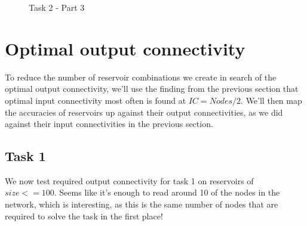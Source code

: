 \begin{figure*}[ht]
    \centering
    \resizebox{\textwidth}{!}{
        \subfloat[N=70]{
            
        }
        \subfloat[N=75]{
            
        }
    }
    \resizebox{\textwidth}{!}{
        \subfloat[N=80]{
            
        }
        \subfloat[N=85]{
            
        }
    }
    \resizebox{\textwidth}{!}{
        \subfloat[N=90]{
            
        }
        \subfloat[N=95]{
            
        }
    }
    \resizebox{0.5\textwidth}{!}{
        \subfloat[N=100]{
            
        }
    }
    \caption{Task 2 - Part 3}
\end{figure*}

\section{Optimal output connectivity}

To reduce the number of reservoir combinations we create in search of the optimal output connectivity,
we'll use the finding from the previous section that optimal input connectivity most often is found at $IC=Nodes/2$.
We'll then map the accuracies of reservoirs up against their output connectivities, as we did against their input connectivities in the previous section.

\subsection{Task 1}

We now test required output connectivity for task 1 on reservoirs of $size <= 100$.
Seems like it's enough to read around 10 of the nodes in the network,
which is interesting, as this is the same number of nodes that are required to solve the task in the first place!

\begin{figure*}[ht]
    \centering
    \resizebox{\textwidth}{!}{
        \subfloat[N=10]{
            
        }
        \subfloat[N=20]{
            
        }
    }
    \resizebox{\textwidth}{!}{
        \subfloat[N=30]{
            
        }
        \subfloat[N=40]{
            
        }
    }
    \resizebox{\textwidth}{!}{
        \subfloat[N=50]{
            
        }
        \subfloat[N=60]{
            
        }
    }
\end{figure*}

